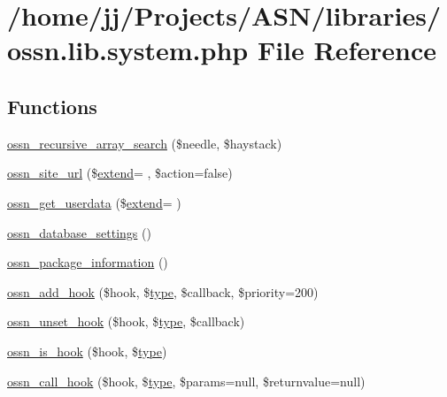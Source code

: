 \hypertarget{ossn_8lib_8system_8php}{}\section{/home/jj/\+Projects/\+A\+S\+N/libraries/ossn.lib.\+system.\+php File Reference}
\label{ossn_8lib_8system_8php}
\subsection*{Functions}
\begin{DoxyCompactItemize}
\item 
\hyperlink{ossn_8lib_8system_8php_a1dce814763678ffe8faacfb992e346ab}{ossn\+\_\+recursive\+\_\+array\+\_\+search} (\$needle, \$haystack)
\item 
\hyperlink{ossn_8lib_8system_8php_a2f12f9244f99eccd1225afb76ef2ab65}{ossn\+\_\+site\+\_\+url} (\$\hyperlink{jquery-ui_8min_8js_a087edaba374de09e6e0f0c9a8c157c87}{extend}= \textquotesingle{}\textquotesingle{}, \$action=false)
\item 
\hyperlink{ossn_8lib_8system_8php_a5a54f05919bc85f280780ebf6b73cf96}{ossn\+\_\+get\+\_\+userdata} (\$\hyperlink{jquery-ui_8min_8js_a087edaba374de09e6e0f0c9a8c157c87}{extend}= \textquotesingle{}\textquotesingle{})
\item 
\hyperlink{ossn_8lib_8system_8php_a60672c68bfe595489b4bde5467c36681}{ossn\+\_\+database\+\_\+settings} ()
\item 
\hyperlink{ossn_8lib_8system_8php_a2939b5e3effcb7950a9d7abda8ba3e8e}{ossn\+\_\+package\+\_\+information} ()
\item 
\hyperlink{ossn_8lib_8system_8php_a1beb5f8dac01841a0044e2fe5ea4ae1c}{ossn\+\_\+add\+\_\+hook} (\$hook, \$\hyperlink{_ossn_wall_2actions_2wall_2post_2group_8php_a2dc1bb4e1ed0029daa81ac0776b14b51}{type}, \$callback, \$priority=200)
\item 
\hyperlink{ossn_8lib_8system_8php_a9604b870a18a1cf43255e187a0b21c97}{ossn\+\_\+unset\+\_\+hook} (\$hook, \$\hyperlink{_ossn_wall_2actions_2wall_2post_2group_8php_a2dc1bb4e1ed0029daa81ac0776b14b51}{type}, \$callback)
\item 
\hyperlink{ossn_8lib_8system_8php_ae29c30c131d7600928d7a2fc28bcd322}{ossn\+\_\+is\+\_\+hook} (\$hook, \$\hyperlink{_ossn_wall_2actions_2wall_2post_2group_8php_a2dc1bb4e1ed0029daa81ac0776b14b51}{type})
\item 
\hyperlink{ossn_8lib_8system_8php_a2f212f5719e33a233483f3ac67cf372d}{ossn\+\_\+call\+\_\+hook} (\$hook, \$\hyperlink{_ossn_wall_2actions_2wall_2post_2group_8php_a2dc1bb4e1ed0029daa81ac0776b14b51}{type}, \$params=null, \$returnvalue=null)

\end{DoxyCompactItemize}
